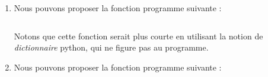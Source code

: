 \begin{enumerate}
\item Nous pouvons proposer la fonction programme suivante :
\iflivret

\inputminted{python}{../../exos/algo/ALG-004/ALG-004-1-cor.py}
\else

\fi
Notons que cette fonction serait plus courte en utilisant la notion de \emph{dictionnaire} python, qui ne figure pas au 
programme.
\item Nous pouvons proposer la fonction programme suivante :
\iflivret

\else

\fi

\end{enumerate}
